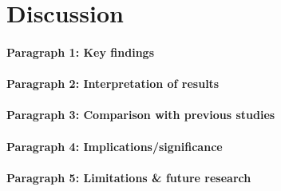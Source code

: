 \section{Discussion}


\paragraph{Paragraph 1: Key findings}

\paragraph{Paragraph 2: Interpretation of results}

\paragraph{Paragraph 3: Comparison with previous studies}

\paragraph{Paragraph 4: Implications/significance}

\paragraph{Paragraph 5: Limitations \& future research}

\cite{janssens2025comparative}
